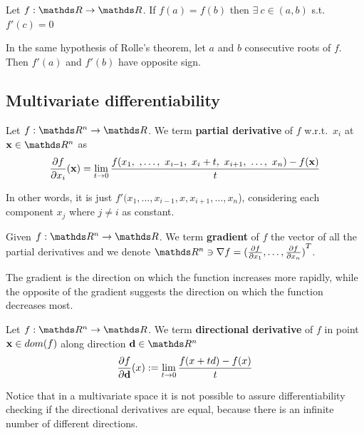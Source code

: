 \documentclass[computationalMathematics.tex]{subfiles}
\begin{document}
\begin{theorem}
Let $f: \R \to \R$. If $f(a) = f(b)$ then $\exists~c \in (a, b)$ s.t.~$f'(c) = 0$
\end{theorem}

\begin{corollary}
In the same hypothesis of Rolle's theorem, let $a$ and $b$ consecutive roots of $f$. Then $f'(a)$ and $f'(b)$ have opposite sign.
\end{corollary}

\subsection{Multivariate differentiability}

\begin{definition}
Let $f : \R^n \to \R$. We term \textbf{partial derivative} of $f$ w.r.t.~$x_i$ at $\vect{x} \in \R^n$ as
  \[
  \frac{\partial f}{\partial x_i}({\bf x }) = \lim_{t \to 0} \frac{f(x_1,~, \ldots,~x_{i-1},~x_i + t,~x_{i+1},~\ldots,~x_n) - f({\bf x })}{t}
  \]
       
In other words, it is just $f'(x_1,\dots,x_{i-1},x,x_{i+1},\dots,x_n$), considering each component $x_j$ where $j \neq i$ as constant.
\end{definition}

\begin{definition}[Gradient]
Given $f : \R^n \to \R$. We term \textbf{gradient} of $f$ the vector of all the partial derivatives and we denote $\R^n \ni \nabla f = \tr{(\parder{f}{x_1}, \ldots, \parder{f}{x_n})}$.
\end{definition}

\noindent The gradient is the direction on which the function increases more rapidly, while the opposite of the gradient suggests the direction on which the function decreases most.

\begin{definition}
  Let $f : \R^n \to \R$. We term \textbf{directional derivative} of $f$ in point ${\bf x } \in dom(f)$ along direction $\vect{d} \in \R^n$
  \[
    \frac{\partial f}{\partial {\bf d }}(x) :=	\lim_{t \to 0} \frac{f(x + td ) - f(x)}{t}
  \]
\end{definition}

\noindent Notice that in a multivariate space it is not possible to assure differentiability checking if the directional derivatives are equal, because there is an infinite number of different directions.
\end{document}
